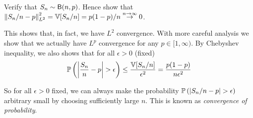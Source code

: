 \begin{exercise}
Verify that $S_n \sim \mathsf{B}(n,p)$. Hence show that $\left\| S_n/n - p \right\|^2_{L^2} = \mathbb{V}[S_n/n] = p(1-p)/n \overset{n \to \infty}{\to} 0$.
\end{exercise}

This shows that, in fact, we have $L^2$ convergence. With more careful analysis we show that we actually have $L^p$ convergence for any $p \in [1,\infty)$. By Chebyshev inequality, we also shows that for all $\epsilon > 0$ (fixed)
\begin{equation} \label{eq:Bernoulli_Chebyshev}
    \mathbb{P}\left( \left| \frac{S_n}{n} - p \right| > \epsilon \right) \leq \frac{\mathbb{V}[S_n/n]}{\epsilon^2} = \frac{p(1-p)}{n\epsilon^2}
\end{equation}

So for all $\epsilon > 0$ fixed, we can always make the probability $\mathbb{P}\left( \left| S_n/n - p \right| > \epsilon \right)$ arbitrary small by choosing sufficiently large $n$. This is known as \textit{convergence of probability}.\\

